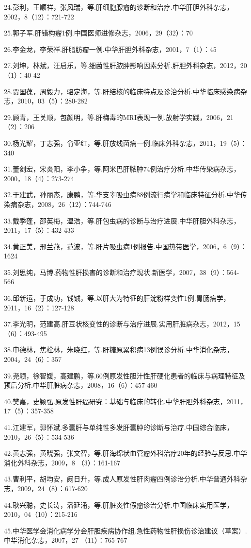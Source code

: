 24.彭利，王顺祥，张风瑞，等.肝细胞腺瘤的诊断和治疗.中华肝胆外科杂志，2002，8（12）：721-722

25.郭子军.肝错构瘤1例.中国医师进修杂志，2006，29（32）：70

26.李金龙，李荣祥.肝脂肪瘤一例.中华肝胆外科杂志，2001，7（1）：45

27.刘坤，林斌，汪启乐，等.细菌性肝脓肿影响因素分析.肝胆外科杂志，2012，20（1）：40-42

28.贾国葆，周毅力，骆定海，等.肝结核的临床特点及诊治分析.中华临床感染病杂志，2010，03（5）：280-282

29.顾青，王关顺，包颜明，等.肝梅毒的MRI表现一例.放射学实践，2006，21（2）：206

30.杨光耀，丁志强，俞亚红，等.肝放线菌病一例.临床外科杂志，2011，19（5）：340

31.董剑宏，宋炎阳，李小争，等.阿米巴肝脓肿74例治疗分析.中华传染病杂志，2000，18（4）：273-274

32.于建武，孙丽杰，康鹏，等.华支睾吸虫病88例流行病学和临床特征分析.中华传染病杂志，2008，26（12）：744-746

33.戴季蓬，邵英梅，温浩，等.肝包虫病的诊断与治疗进展.中华肝胆外科杂志，2011，17（5）：432-433

34.黄正美，邢兰燕，范波，等.肝片吸虫病1例报告.中国热带医学，2006，6（9）：1624

35.刘思纯，马博.药物性肝损害的诊断和治疗现状.新医学，2007，38（9）：564-566

36.邱新运，于成功，钱铖，等.以肝大为特征的肝淀粉样变性1例.胃肠病学，2011，16（2）：127-128

37.李光明，范建高.肝豆状核变性的诊断与治疗进展.实用肝脏病杂志，2012，15（6）：493-495

38.申德林，焦栓林，朱晓红，等.肝糖原累积病13例误诊分析.中华消化杂志，2004，24（6）：357

39.尧颖，徐智媛，高建鹏，等.60例原发性胆汁性肝硬化患者的临床与病理特征及预后分析.中华肝脏病杂志，2008，16（6）：457-460

40.樊嘉，史颖弘.原发性肝癌研究：基础与临床的转化.中华肝胆外科杂志，2011，17（5）：357-358

41.江建军，郭怀斌.多囊肝与单纯性多发肝囊肿的诊断与治疗.中国综合临床，2010，26（5）：534-536

42.黄志强，黄晓强，张文智，等.肝海绵状血管瘤外科治疗20年的经验与反思.中华消化外科杂志，2009，8
（3）：161-167

43.曹利平，胡均安，阙日升，等.成人原发性肝肉瘤四例诊治分析.中华普通外科杂志，2009，24（8）：617-620

44.耿兴聪，史长涛，潘延涌，等.肝脏炎性假瘤诊治分析.中国临床实用医学，2010，04（10）：215-216

45.中华医学会消化病学分会肝胆疾病协作组.急性药物性肝损伤诊治建议（草案）.中华消化杂志，2007，27
（11）：765-767

\protect\hypertarget{text00244.html}{}{}

